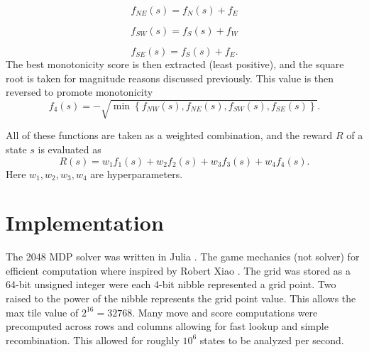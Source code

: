 \documentclass[conference]{IEEEtran}
\begin{document}
$$f_{NE}(s) = f_{N}(s) + f_{E}$$

$$f_{SW}(s) = f_{S}(s) + f_{W}$$

$$f_{SE}(s) = f_{S}(s) + f_{E}.$$
The best monotonicity score is then extracted (least positive), and the square root is taken for magnitude reasons discussed previously. This value is then reversed to promote monotonicity
$$ f_{4}(s) = -\sqrt{\min\left\{ f_{NW}(s),f_{NE}(s),f_{SW}(s),f_{SE}(s) \right\}}.$$

All of these functions are taken as a weighted combination, and the reward $R$ of a state $s$ is evaluated as
$$ R(s) = w_1f_{1}(s) + w_2f_{2}(s) + w_3f_{3}(s) + w_4f_{4}(s). $$
Here $w_1, w_2, w_3, w_4$ are hyperparameters.

\section{Implementation}
The 2048 MDP solver was written in Julia \cite{julia}. The game mechanics (not solver) for efficient computation where inspired by Robert Xiao \cite{nneo}. The grid was stored as a 64-bit unsigned integer were each 4-bit nibble represented a grid point. Two raised to the power of the nibble represents the grid point value. This allows the max tile value of $2^{16} = 32768$. Many move and score computations were precomputed across rows and columns allowing for fast lookup and simple recombination. This allowed for roughly $10^6$ states to be analyzed per second.
\end{document}
